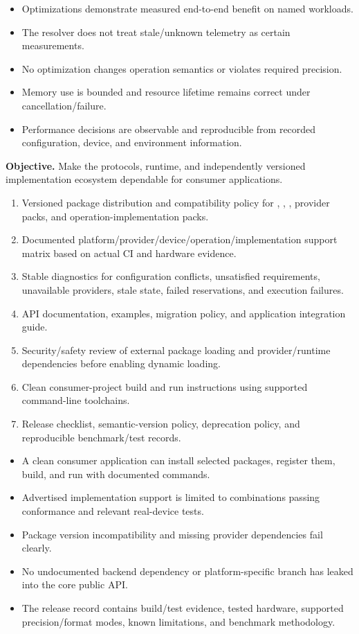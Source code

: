 \exitcriteria
\begin{itemize}
  \item Optimizations demonstrate measured end-to-end benefit on named workloads.
  \item The resolver does not treat stale/unknown telemetry as certain measurements.
  \item No optimization changes operation semantics or violates required precision.
  \item Memory use is bounded and resource lifetime remains correct under cancellation/failure.
  \item Performance decisions are observable and reproducible from recorded configuration, device, and environment information.
\end{itemize}


\textbf{Objective.} Make the protocols, runtime, and independently versioned implementation ecosystem dependable for consumer applications.

\deliverables
\begin{enumerate}
  \item Versioned package distribution and compatibility policy for \IPP{}, \GEP{}, \IPR{}, provider packs, and operation-implementation packs.
  \item Documented platform/provider/device/operation/implementation support matrix based on actual CI and hardware evidence.
  \item Stable diagnostics for configuration conflicts, unsatisfied requirements, unavailable providers, stale state, failed reservations, and execution failures.
  \item API documentation, examples, migration policy, and application integration guide.
  \item Security/safety review of external package loading and provider/runtime dependencies before enabling dynamic loading.
  \item Clean consumer-project build and run instructions using supported command-line toolchains.
  \item Release checklist, semantic-version policy, deprecation policy, and reproducible benchmark/test records.
\end{enumerate}

\exitcriteria
\begin{itemize}
  \item A clean consumer application can install selected packages, register them, build, and run with documented commands.
  \item Advertised implementation support is limited to combinations passing conformance and relevant real-device tests.
  \item Package version incompatibility and missing provider dependencies fail clearly.
  \item No undocumented backend dependency or platform-specific branch has leaked into the core public API.
  \item The release record contains build/test evidence, tested hardware, supported precision/format modes, known limitations, and benchmark methodology.
\end{itemize}